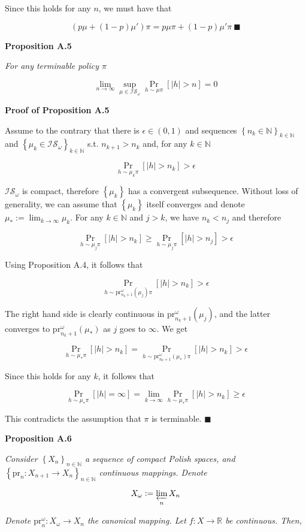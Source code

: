 \documentclass[a4paper]{article}
\newcommand{\Co}[1]{}
\newcommand{\AP}[1]{\left(#1\right)}
\newcommand{\AB}[1]{\left[#1\right]}
\newcommand{\AC}[1]{\left\{#1\right\}}
\newcommand{\Abs}[1]{\left\vert #1 \right\vert}
\newcommand{\Pa}[2]{\underset{#1}{\operatorname{Pr}}\AB{#2}}
\newcommand{\Nats}{\mathbb{N}}
\newcommand{\Reals}{\mathbb{R}}
\newcommand{\Lim}[1]{\lim_{#1 \rightarrow \infty}}
\newcommand{\IS}{\mathcal{IS}}
\newcommand{\Prj}{\mathrm{pr}}
\newcommand{\Prjo}{\mathrm{pr}^\omega_n}
\begin{document}
Since this holds for any $n$, we must have that

$$\AP{p\mu+(1-p)\mu'}\pi=p\mu\pi+(1-p)\mu'\pi\ \blacksquare$$

\textbf{Proposition A.5}\Co{b}

\textit{For any terminable policy $\pi$}\Co{i}

$$\Lim{n}\sup_{\mu\in\IS_\omega}\Pa{h\sim\mu\pi}{\Abs{h}>n}=0$$

\textbf{Proof of Proposition A.5}\Co{b}

Assume to the contrary that there is $\epsilon\in(0,1)$ and sequences $\AC{n_k\in\Nats}_{k\in\Nats}$ and $\AC{\mu_k\in\IS_\omega}_{k\in\Nats}$ s.t. $n_{k+1} > n_k$ and, for any $k\in\Nats$

$$\Pa{h\sim\mu_k\pi}{\Abs{h}>n_k} > \epsilon$$

$\IS_\omega$ is compact, therefore $\AC{\mu_k}$ has a convergent subsequence. Without loss of generality, we can assume that $\AC{\mu_k}$ itself converges and denote $\mu_*:=\Lim{k}\mu_k$. For any $k\in\Nats$ and $j > k$, we have $n_k < n_j$ and therefore

$$\Pa{h\sim\mu_j\pi}{\Abs{h}>n_k} \geq \Pa{h\sim\mu_j\pi}{\Abs{h}>n_j} > \epsilon$$

Using Proposition A.4, it follows that

$$\Pa{h\sim\Prj^\omega_{n_k+1}\AP{\mu_j}\pi}{\Abs{h}>n_k} > \epsilon$$

The right hand side is clearly continuous in $\Prj^\omega_{n_k+1}\AP{\mu_j}$, and the latter converges to $\Prj^\omega_{n_k+1}\AP{\mu_*}$ as $j$ goes to $\infty$. We get

$$\Pa{h\sim\mu_*\pi}{\Abs{h}>n_k}=\Pa{h\sim\Prj^\omega_{n_k+1}\AP{\mu_*}\pi}{\Abs{h}>n_k} > \epsilon$$

Since this holds for any $k$, it follows that

$$\Pa{h\sim\mu_*\pi}{\Abs{h}=\infty}=\Lim{k}\Pa{h\sim\mu_*\pi}{\Abs{h}>n_k} \geq \epsilon$$

This contradicts the assumption that $\pi$ is terminable. $\blacksquare$

\textbf{Proposition A.6}\Co{b}

\textit{Consider $\AC{X_n}_{n\in\Nats}$ a sequence of compact Polish spaces, and $\AC{\Prj_n:X_{n+1}\rightarrow X_n}_{n\in\Nats}$ continuous mappings. Denote}\Co{i}

$$X_\omega:=\varprojlim_n X_n$$

\textit{Denote $\Prjo:X_\omega\rightarrow X_n$ the canonical mapping. Let $f:X\rightarrow\Reals$ be continuous. Then,}\Co{i}
\end{document}
